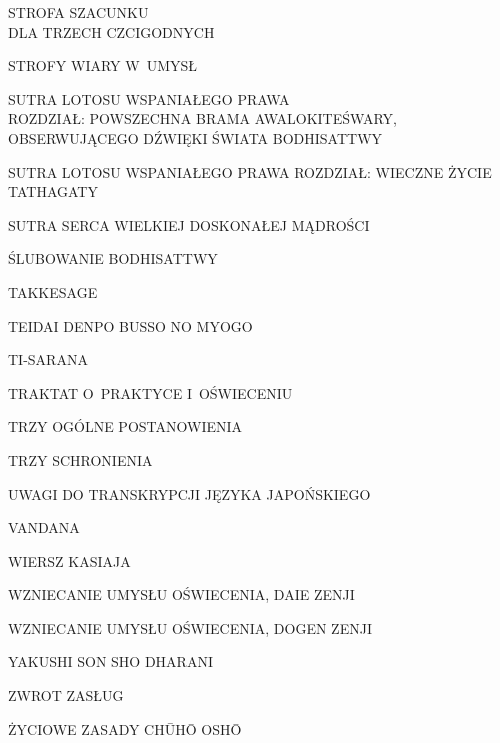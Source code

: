 \par\noindent STROFA SZACUNKU\\ DLA TRZECH CZCIGODNYCH \dotfill \makebox[1.0cm][r]{\pageref{strofa_szacunku}}
\par\noindent STROFY WIARY W~UMYSŁ \dotfill \makebox[1.0cm][r]{\pageref{strofy_wiary_w_umysl}}
\par\noindent SUTRA LOTOSU WSPANIAŁEGO PRAWA\\ROZDZIAŁ: POWSZECHNA BRAMA AWALOKITEŚWARY, OBSERWUJĄCEGO DŹWIĘKI ŚWIATA BODHISATTWY \dotfill \makebox[1.0cm][r]{\pageref{sutralotosu_powszechna_brama}}
\par\noindent SUTRA LOTOSU WSPANIAŁEGO PRAWA ROZDZIAŁ: WIECZNE ŻYCIE TATHAGATY \dotfill \makebox[1.0cm][r]{\pageref{sutralotosu_wieczne_zycie}}
\par\noindent SUTRA SERCA WIELKIEJ DOSKONAŁEJ MĄDROŚCI \dotfill \makebox[1.0cm][r]{\pageref{serce_doskonalej_madrosci}}
\par\noindent ŚLUBOWANIE BODHISATTWY \dotfill \makebox[1.0cm][r]{\pageref{slubowanie_bodhisattwy}}
\par\noindent TAKKESAGE \dotfill \makebox[1.0cm][r]{\pageref{tekkesage}}
\par\noindent TEIDAI DENPO BUSSO NO MYOGO \dotfill \makebox[1.0cm][r]{\pageref{teidai_denpo_busso_no_myogo}}
\par\noindent TI-SARANA \dotfill \makebox[1.0cm][r]{\pageref{ti-sarana}}
\par\noindent TRAKTAT O~PRAKTYCE I~OŚWIECENIU \dotfill \makebox[1.0cm][r]{\pageref{traktat_o_praktyce}}
\par\noindent TRZY OGÓLNE POSTANOWIENIA \dotfill \makebox[1.0cm][r]{\pageref{trzy_ogolne_postanowienia}}
\par\noindent TRZY SCHRONIENIA \dotfill \makebox[1.0cm][r]{\pageref{trzy_schronienia}}
\par\noindent UWAGI DO TRANSKRYPCJI JĘZYKA JAPOŃSKIEGO \dotfill \makebox[1.0cm][r]{\pageref{uwagi_do_transkrypcji}}
\par\noindent VANDANA \dotfill \makebox[1.0cm][r]{\pageref{vandana}}
\par\noindent WIERSZ KASIAJA \dotfill \makebox[1.0cm][r]{\pageref{wiersz_kesy}}
\par\noindent WZNIECANIE UMYSŁU OŚWIECENIA, DAIE ZENJI \dotfill \makebox[1.0cm][r]{\pageref{wzniecanie_umyslu_oswiecenia_daie}}
\par\noindent WZNIECANIE UMYSŁU OŚWIECENIA, DOGEN ZENJI \dotfill \makebox[1.0cm][r]{\pageref{wzniecanie_umyslu_oswiecenia_dogen}}
\par\noindent YAKUSHI SON SHO DHARANI \dotfill \makebox[1.0cm][r]{\pageref{yakushi_son_sho_dharani}}
\par\noindent ZWROT ZASŁUG \dotfill \makebox[1.0cm][r]{\pageref{zwrot_zaslug}}
\par\noindent ŻYCIOWE ZASADY CH\=UH\=O OSH\=O \dotfill \makebox[1.0cm][r]{\pageref{zyciowe_zasady_chuho_osho}}
